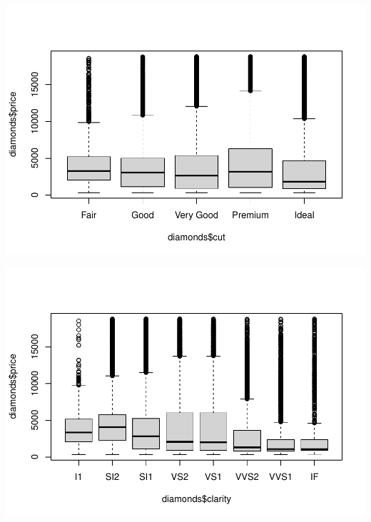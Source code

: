 \documentclass[
]{book}
\newenvironment{Shaded}{\begin{snugshade}}{\end{snugshade}}
\newcommand{\FunctionTok}[1]{\textcolor[rgb]{0.00,0.00,0.00}{#1}}
\newcommand{\NormalTok}[1]{#1}
\newcommand{\SpecialCharTok}[1]{\textcolor[rgb]{0.00,0.00,0.00}{#1}}
\begin{document}
\includegraphics{13-MultipleLinearRegression_files/figure-latex/unnamed-chunk-3-4.pdf}

\begin{Shaded}
\end{Shaded}

\includegraphics{13-MultipleLinearRegression_files/figure-latex/unnamed-chunk-3-5.pdf}

\begin{Shaded}
\end{Shaded}
\end{document}
